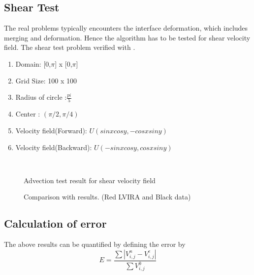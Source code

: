 \subsection{Shear Test}
The real problems typically encounters the interface deformation, which includes merging and deformation. Hence the algorithm has to be 
tested for shear velocity field. The shear test problem verified with \cite{Gerlach2006}. 

   \begin{enumerate}
 \item Domain: [0,$\pi$] x [0,$\pi$]
 \item Grid Size: 100 x 100
 \item Radius of circle :$\frac{pi}{5}$
 \item Center : $(\pi/2,\pi/4)$
 \item Velocity field(Forward):  $U(sin x cos y, -cos x sin y)$
  \item Velocity field(Backward):  $U(-sin x cos y, cos x sin y)$
 \end{enumerate}
 
\begin{figure}[H]
\centering
 \\
 \caption{Advection test result for shear velocity field}
\end{figure}

\begin{figure}[H]
 \centering
 \caption{Comparison with \cite{Gerlach2006} results. (Red LVIRA and Black \cite{Gerlach2006} data)}
\end{figure}

\subsection{Calculation of error}
The above results can be quantified by defining the error by
\begin{equation}
 E = \frac{\sum |{V^n_{i,j}-V^e_{i,j}}|}{\sum V^0_{i,j}}
\end{equation}

